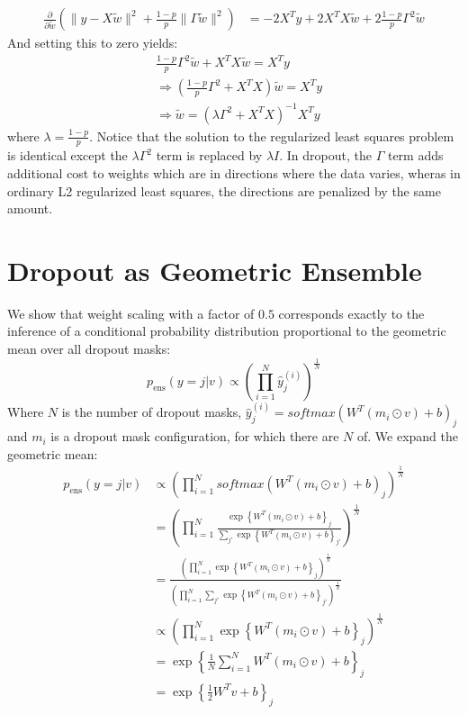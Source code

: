 \documentclass[paper=a4, fontsize=11pt]{scrartcl} %
\numberwithin{equation}{section} %
\numberwithin{figure}{section} %
\numberwithin{table}{section} %
\newcommand{\dP}[2]{\frac{\partial #1}{\partial #2}}
\begin{document}
\begin{enumerate}[(a)]
	\begin{align*}
		\dP{}{\tilde{w}}\left( \| y-X\tilde{w}\|^2 + \frac{1-p}{p} \|\Gamma \tilde{w}\|^2\right) &= -2X^Ty + 2X^TX\tilde{w} + 2\frac{1-p}{p}\Gamma^2\tilde{w}
	\end{align*}
	And setting this to zero yields:
	\begin{align*}
		&\frac{1-p}{p}\Gamma^2\tilde{w} + X^TX\tilde{w} =  X^Ty\\
		&\Rightarrow  \left(\frac{1-p}{p}\Gamma^2 + X^TX\right)\tilde{w} = X^Ty\\
		&\Rightarrow \tilde{w} = \left(\lambda\Gamma^2 + X^TX\right)^{-1}X^Ty
	\end{align*}
	where $\lambda=\frac{1-p}{p}$. Notice that the solution to the regularized least squares problem is identical except the $\lambda\Gamma^2$ term is replaced by $\lambda I$. In dropout, the $\Gamma$ term adds additional cost to weights which are in directions where the data varies, wheras in ordinary L2 regularized least squares, the directions are penalized by the same amount.
\end{enumerate}

\section{Dropout as Geometric Ensemble}

We show that weight scaling with a factor of $0.5$ corresponds exactly to the inference of a conditional probability distribution proportional to the geometric mean over all dropout masks:
$$ p_{\text{ens}}(y=j|v) \propto \left( \prod_{i=1}^N \hat{y}_j^{(i)} \right)^{\frac{1}{N}} $$
Where $N$ is the number of dropout masks, $\hat{y}_j^{(i)}=softmax\left(W^T(m_i\odot v)+b\right)_j$ and $m_i$ is a dropout mask configuration, for which there are $N$ of. We expand the geometric mean:
\begin{align*}
p_{\text{ens}}(y=j|v) &\propto \left( \prod_{i=1}^N softmax\left(W^T(m_i\odot v)+b\right)_j\right)^{\frac{1}{N}}\\
&= \left(\prod_{i=1}^N \frac{\exp\left\{W^T(m_i\odot v)+b\right\}_j}{\sum_{j'}\exp\left\{W^T(m_i\odot v)+b\right\}_{j'}}\right)^\frac{1}{N}\\
&= \frac{\left(\prod_{i=1}^N \exp\left\{W^T(m_i\odot v)+b\right\}_j \right)^{\frac{1}{N}}}{\left(\prod_{i=1}^N\sum_{j'}\exp\left\{W^T(m_i\odot v)+b\right\}_{j'}\right)^{\frac{1}{N}}}\\
&\propto \left(\prod_{i=1}^N \exp\left\{W^T(m_i\odot v)+b\right\}_j \right)^{\frac{1}{N}}\\
&=\exp\left\{\frac{1}{N}\sum_{i=1}^N W^T(m_i\odot v)+b\right\}_j\\
&=\exp\left\{\frac{1}{2}W^Tv+b\right\}_j
\end{align*}


\newpage



\end{document}
